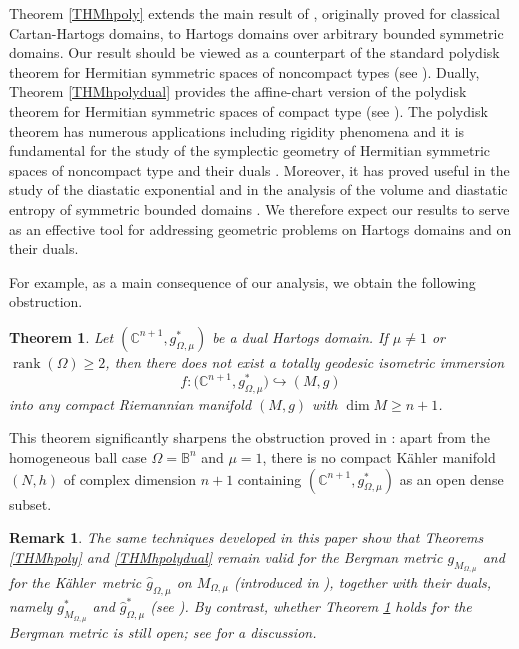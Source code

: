 \documentclass[reqno, 11pt]{amsart}
\newtheorem{theorem}[theor]{Theorem}
\newtheorem{remark}{Remark}
\newcommand{\B}{\mathbb{B}}
\newcommand{\C}{\mathbb{C}}
\newcommand{\K}{K\"ahler}
\begin{document}
Theorem \ref{THMhpoly} extends the main result of \cite{MOSSAZEDDA2022polch}, originally proved for classical Cartan-Hartogs domains, to Hartogs domains over arbitrary bounded symmetric domains. Our result should  be viewed as a counterpart of the standard polydisk theorem for Hermitian symmetric spaces of noncompact types (see \cite[Part~1]{WolfBook1969FineStructureHSSpolydisc}). Dually, Theorem \ref{THMhpolydual} provides the affine-chart version of the polydisk theorem for Hermitian symmetric spaces of compact type (see \cite{HELGASONbookDiffGeom1978}). 
The polydisk theorem has numerous applications  including rigidity phenomena \cite{MOK1989MetricRigidityThmLocHSS, Mok2011ALM} and it is fundamental  for the study of  the symplectic geometry of Hermitian symmetric spaces of noncompact type
and their duals \cite{DISCALALOI2008sympdual,LoiMossaZuddas2015}.
Moreover, it has proved useful in the study of the diastatic exponential \cite{LOIMOSSA2011DistExp} and in the analysis of the volume and diastatic entropy of symmetric bounded domains \cite{MOSSA2013VolumeEntr}. We therefore expect our results to serve as an effective tool for addressing geometric problems on Hartogs domains and on their duals.

\smallskip

For example, as a main consequence of our analysis, we obtain the following obstruction.

\begin{theorem}\label{THMCORhpolydual}
Let $(\mathbb{C}^{n+1}, g_{{\Omega,\mu}}^{*})$ be a dual Hartogs domain. If $\mu \neq 1$ or $\operatorname{rank}(\Omega) \ge 2$, then there does not exist a totally geodesic isometric immersion
\[
f: \big(\mathbb{C}^{n+1}, g_{{\Omega,\mu}}^{*}\big) \hookrightarrow (M,g)
\]
into any compact Riemannian manifold $(M,g)$ with $\dim M \ge n+1$.
\end{theorem}

This theorem significantly sharpens the obstruction proved in \cite{LOIMOSSAZUDDAS2024dualemb}: 
apart from the homogeneous ball case $\Omega=\B^{n}$ and $\mu=1$, 
 there is no compact K\"ahler manifold $(N,h)$ of complex dimension $n+1$ containing 
$(\C^{n+1}, g_{{\Omega,\mu}}^{*})$ as an open dense subset. 


\smallskip

\begin{remark}\rm
The same techniques developed in this paper show that Theorems \ref{THMhpoly} and \ref{THMhpolydual} remain valid for the Bergman metric $g_{M_{\Omega, \mu}}$ and for the \K\ metric $\hat g_{\Omega,\mu}$ on $M_{\Omega,\mu}$ (introduced in \cite{LOIMOSSAZUDDAS2024dualemb}), together with their duals, namely $g_{M_{\Omega, \mu}}^{*}$ and $\hat g^{*}_{\Omega,\mu}$ (see \cite{LOIMOSSAZUDDAS2025bergman}). By contrast, whether Theorem \ref{THMCORhpolydual} holds for the Bergman metric is still open; see \cite[Sect.~4]{LOIMOSSAZUDDAS2025bergman} for a discussion.
\end{remark}
\end{document}
